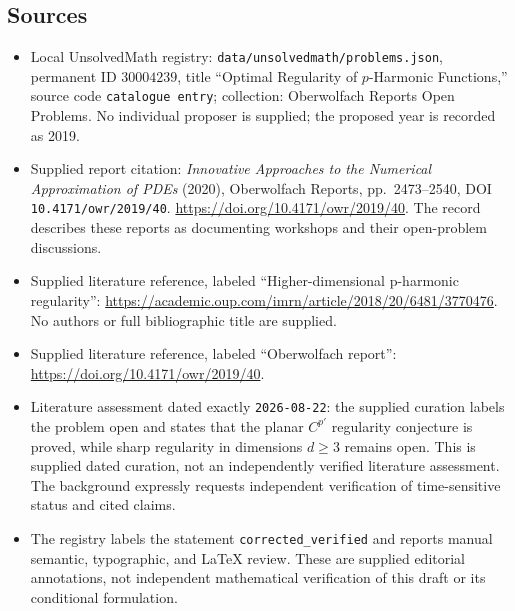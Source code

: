 \documentclass[11pt]{article}
\begin{document}
\subsection{Sources}
\begin{itemize}
\item Local UnsolvedMath registry: \texttt{data/unsolvedmath/problems.json}, permanent ID \(30004239\), title ``Optimal Regularity of \(p\)-Harmonic Functions,'' source code \texttt{catalogue entry}; collection: Oberwolfach Reports Open Problems. No individual proposer is supplied; the proposed year is recorded as 2019.
\item Supplied report citation: \emph{Innovative Approaches to the Numerical Approximation of PDEs} (2020), Oberwolfach Reports, pp.\ 2473--2540, DOI \texttt{10.4171/owr/2019/40}. \url{https://doi.org/10.4171/owr/2019/40}. The record describes these reports as documenting workshops and their open-problem discussions.
\item Supplied literature reference, labeled ``Higher-dimensional p-harmonic regularity'': \url{https://academic.oup.com/imrn/article/2018/20/6481/3770476}. No authors or full bibliographic title are supplied.
\item Supplied literature reference, labeled ``Oberwolfach report'': \url{https://doi.org/10.4171/owr/2019/40}.
\item Literature assessment dated exactly \texttt{2026-08-22}: the supplied curation labels the problem open and states that the planar \(C^{p'}\) regularity conjecture is proved, while sharp regularity in dimensions \(d\geq3\) remains open. This is supplied dated curation, not an independently verified literature assessment. The background expressly requests independent verification of time-sensitive status and cited claims.
\item The registry labels the statement \texttt{corrected\_verified} and reports manual semantic, typographic, and LaTeX review. These are supplied editorial annotations, not independent mathematical verification of this draft or its conditional formulation.
\end{itemize}
\end{document}
